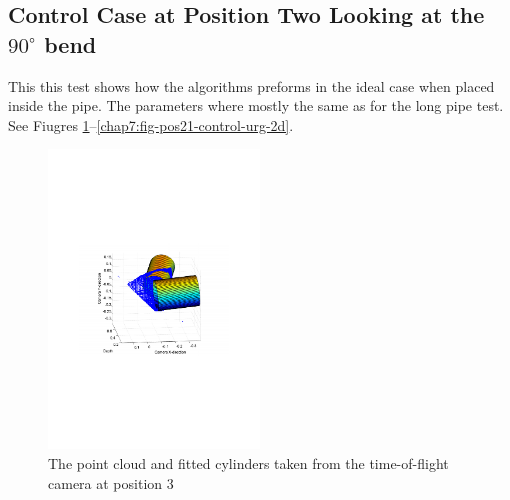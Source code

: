 \subsection{Control Case at Position Two Looking at the $90^\circ$ bend}
This this test shows how the algorithms preforms in the ideal case when placed inside the
pipe. The parameters where mostly the same as for the long pipe test. See Fiugres
\ref{chap7:fig-pos21-control-tof-3d}--\ref{chap7:fig-pos21-control-urg-2d}.
\begin{figure}[htbp]
    \centering
    \includegraphics[width=0.5\textwidth]{pics/pos21-control-tof-3d}
    \caption{The point cloud and fitted cylinders taken from the time-of-flight camera at
    position 3}
    \label{chap7:fig-pos21-control-tof-3d}
\end{figure}

